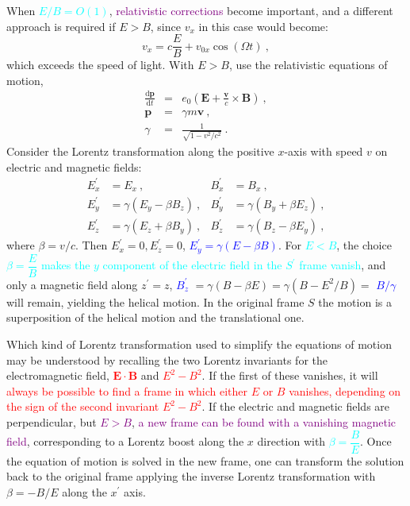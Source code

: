 \documentclass[12pt,a4paper]{article}
\renewcommand{\vec}[1]{\boldsymbol{#1}}
\newcommand{\dif}{\mathrm{d}}
\begin{document}
\cite{2015bps..book.....C} When \textcolor{cyan}{$E/B = O(1)$}, \textcolor{purple}{relativistic corrections} become important, and a different approach is required if $E > B$, since $v_x$ in this case would become:
\begin{equation*}
v_x = c\frac{E}{B} +v_{0x} \cos (\Omega t) ~,
\end{equation*}
which exceeds the speed of light. With $E > B$, use the relativistic equations of motion,
\begin{eqnarray*}
\frac{\dif \vec{p}}{\dif t} &=& e_0(\vec{E} +\frac{\vec{v}}{c} \times \vec{B}) ~,\\
\vec{p} &=& \gamma m \vec{v} ~, \\
\gamma &=& \frac{1}{\sqrt{1-v^2/c^2}} ~.
\end{eqnarray*}
Consider the Lorentz transformation along the positive $x$-axis with speed $v$ on electric and magnetic fields:
\begin{align} 
E^\prime_x &= E_x ~, & B^\prime_x &= B_x ~,\\
E^\prime_y &= \gamma(E_y -\beta B_z) ~, & B^\prime_y &= \gamma (B_y +\beta E_z) ~,\\
E^\prime_z &= \gamma(E_z +\beta B_y) ~, & B^\prime_z &= \gamma (B_z -\beta E_y) ~,
\end{align} 
where $\beta = v/c$. Then $E^\prime_x = 0, E^\prime_z = 0$, \textcolor{blue}{$E^\prime_y = \gamma(E - \beta B)$}. For \textcolor{cyan}{$E < B$}, the choice \textcolor{cyan}{$\beta = \dfrac{E}{B}$ makes the $y$ component of the electric field in the $S^\prime$ frame vanish}, and only a magnetic field along $z^\prime  = z$, \textcolor{blue}{$B^\prime_z$} $= \gamma (B -\beta E) = \gamma(B - E^2/B)=$ \textcolor{blue}{$B/\gamma$} will remain, yielding the helical motion. In the original frame $S$ the motion is a superposition of the helical motion and the translational one.

Which kind of Lorentz transformation used to simplify the equations of motion may be understood by recalling the two Lorentz invariants for the electromagnetic field, \textcolor{red}{$\vec{E}\cdot  \vec{B}$} and \textcolor{red}{$E^2 - B^2$}. If the first of these vanishes, it will \textcolor{red}{always be possible to find a frame in which either $E$ or $B$ vanishes, depending on the sign of the second invariant $E^2 - B^2$}. If the electric and magnetic fields are perpendicular, but \textcolor{purple}{$E > B$}, \textcolor{purple}{a new frame can be found with a vanishing magnetic field}, corresponding to a Lorentz boost along the $x$ direction with \textcolor{cyan}{$\beta = \dfrac{B}{E}$}. Once the equation of motion is solved in the new frame, one can transform the solution back to the original frame applying the inverse Lorentz transformation with $\beta = -B/E$ along the $x^\prime$ axis.
\end{document}
